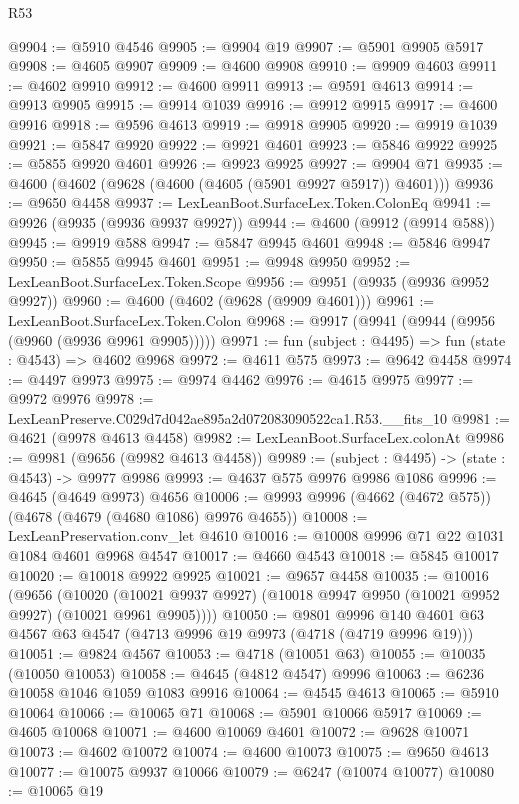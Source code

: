 \begin{lexlean}{R53}
\begin{coremodule}
@9904 := @5910 @4546
@9905 := @9904 @19
@9907 := @5901 @9905 @5917
@9908 := @4605 @9907
@9909 := @4600 @9908
@9910 := @9909 @4603
@9911 := @4602 @9910
@9912 := @4600 @9911
@9913 := @9591 @4613
@9914 := @9913 @9905
@9915 := @9914 @1039
@9916 := @9912 @9915
@9917 := @4600 @9916
@9918 := @9596 @4613
@9919 := @9918 @9905
@9920 := @9919 @1039
@9921 := @5847 @9920
@9922 := @9921 @4601
@9923 := @5846 @9922
@9925 := @5855 @9920 @4601
@9926 := @9923 @9925
@9927 := @9904 @71
@9935 := @4600 (@4602 (@9628 (@4600 (@4605 (@5901 @9927 @5917)) @4601)))
@9936 := @9650 @4458
@9937 := LexLeanBoot.SurfaceLex.Token.ColonEq
@9941 := @9926 (@9935 (@9936 @9937 @9927))
@9944 := @4600 (@9912 (@9914 @588))
@9945 := @9919 @588
@9947 := @5847 @9945 @4601
@9948 := @5846 @9947
@9950 := @5855 @9945 @4601
@9951 := @9948 @9950
@9952 := LexLeanBoot.SurfaceLex.Token.Scope
@9956 := @9951 (@9935 (@9936 @9952 @9927))
@9960 := @4600 (@4602 (@9628 (@9909 @4601)))
@9961 := LexLeanBoot.SurfaceLex.Token.Colon
@9968 := @9917 (@9941 (@9944 (@9956 (@9960 (@9936 @9961 @9905)))))
@9971 := fun (subject : @4495) => fun (state : @4543) => @4602 @9968
@9972 := @4611 @575
@9973 := @9642 @4458
@9974 := @4497 @9973
@9975 := @9974 @4462
@9976 := @4615 @9975
@9977 := @9972 @9976
@9978 := LexLeanPreserve.C029d7d042ae895a2d072083090522ca1.R53.__fits_10
@9981 := @4621 (@9978 @4613 @4458)
@9982 := LexLeanBoot.SurfaceLex.colonAt
@9986 := @9981 (@9656 (@9982 @4613 @4458))
@9989 := (subject : @4495) -> (state : @4543) -> @9977 @9986
@9993 := @4637 @575 @9976 @9986 @1086
@9996 := @4645 (@4649 @9973) @4656
@10006 := @9993 @9996 (@4662 (@4672 @575)) (@4678 (@4679 (@4680 @1086) @9976 @4655))
@10008 := LexLeanPreservation.conv_let @4610
@10016 := @10008 @9996 @71 @22 @1031 @1084 @4601 @9968 @4547
@10017 := @4660 @4543
@10018 := @5845 @10017
@10020 := @10018 @9922 @9925
@10021 := @9657 @4458
@10035 := @10016
    (@9656
      (@10020 (@10021 @9937 @9927) (@10018 @9947 @9950 (@10021 @9952 @9927) (@10021 @9961 @9905))))
@10050 := @9801
    @9996
    @140
    @4601
    @63
    @4567
    @63
    @4547
    (@4713 @9996 @19 @9973 (@4718 (@4719 @9996 @19)))
@10051 := @9824 @4567
@10053 := @4718 (@10051 @63)
@10055 := @10035 (@10050 @10053)
@10058 := @4645 (@4812 @4547) @9996
@10063 := @6236 @10058 @1046 @1059 @1083 @9916
@10064 := @4545 @4613
@10065 := @5910 @10064
@10066 := @10065 @71
@10068 := @5901 @10066 @5917
@10069 := @4605 @10068
@10071 := @4600 @10069 @4601
@10072 := @9628 @10071
@10073 := @4602 @10072
@10074 := @4600 @10073
@10075 := @9650 @4613
@10077 := @10075 @9937 @10066
@10079 := @6247 (@10074 @10077)
@10080 := @10065 @19

\end{coremodule}
\end{lexlean}

